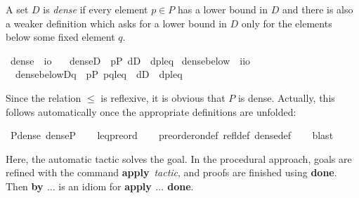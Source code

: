 A set $D$ is \emph{dense} if every element $p\in P$ has a lower bound
in $D$ and there is also a weaker definition which asks for a lower
bound in $D$ only for the elements below some fixed element $q$. 
\begin{isabelle}
  \isamarkupfalse%
\ dense\ {\isacharcolon}{\isacharcolon}\ {\isachardoublequoteopen}i{\isasymRightarrow}o{\isachardoublequoteclose}\ \isanewline
\ \ {\isachardoublequoteopen}dense{\isacharparenleft}D{\isacharparenright}\ {\isacharequal}{\isacharequal}\ {\isasymforall}p{\isasymin}P{\isachardot}\ {\isasymexists}d{\isasymin}D\ {\isachardot}\ {\isasymlangle}d{\isacharcomma}p{\isasymrangle}{\isasymin}leq{\isachardoublequoteclose}\isanewline
\isanewline
{}\isamarkupfalse%
\ dense{\isacharunderscore}below\ {\isacharcolon}{\isacharcolon}\ {\isachardoublequoteopen}i{\isasymRightarrow}i{\isasymRightarrow}o{\isachardoublequoteclose}\ \isanewline
\ \ {\isachardoublequoteopen}dense{\isacharunderscore}below{\isacharparenleft}D{\isacharcomma}q{\isacharparenright}\ {\isacharequal}{\isacharequal}\ {\isasymforall}p{\isasymin}P{\isachardot}\ {\isasymlangle}p{\isacharcomma}q{\isasymrangle}{\isasymin}leq\ {\isasymlongrightarrow}\ {\isacharparenleft}{\isasymexists}d{\isasymin}D\ {\isachardot}\ {\isasymlangle}d{\isacharcomma}p{\isasymrangle}{\isasymin}leq{\isacharparenright}{\isachardoublequoteclose}
\end{isabelle}
Since
the relation $\leqslant$ is reflexive, it is obvious that $P$ is
dense. Actually, this follows automatically once the appropriate definitions are
unfolded:
\begin{isabelle}
\isamarkupfalse%
\ P{\isacharunderscore}dense{\isacharcolon}\ {\isachardoublequoteopen}dense{\isacharparenleft}P{\isacharparenright}{\isachardoublequoteclose}\isanewline
%
\ \ %
%
{}\isamarkupfalse%
\ leq{\isacharunderscore}preord\isanewline
\ \ \isamarkupfalse%
\ preorder{\isacharunderscore}on{\isacharunderscore}def\ refl{\isacharunderscore}def\ dense{\isacharunderscore}def\isanewline
\ \ \isamarkupfalse%
\ blast%
\end{isabelle}
Here, the automatic tactic  solves the goal. In the
procedural approach, goals are refined with the command
\textbf{apply}~\emph{tactic}, and proofs are finished using \textbf{done}. 
Then \textbf{by $\dots$} is an idiom for 
\textbf{apply $\dots$ done}.
 
